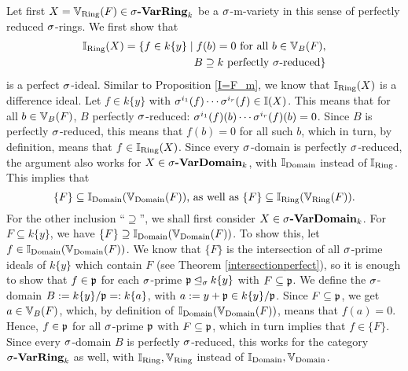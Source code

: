 \begin{prop}
\begin{bew}
Let first $X  = \mathbb{V}_{\operatorname{Ring}}(F) \in \sigma\text{{\normalfont\textbf{-VarRing}}}_k$ be a $\sigma$-m-variety in this sense of perfectly reduced $\sigma$-rings. 
We first show that \begin{align*} \mathbb{I}_{\operatorname{Ring}}(X) =  \{ f \in k\{y\} \mid f(b) = 0 \text{ for all } b \in \mathbb{V}_B(F), \\ B \supseteq k\text{ perfectly }\sigma\text{-reduced} \} \end{align*}
 is a perfect $\sigma$-ideal. Similar to Proposition \ref{I=F_m}, we know that $\mathbb{I}_{\operatorname{Ring}}(X)$ is a difference ideal. Let $f \in k\{y\}$ with $\sigma^{i_1}(f) \cdots \sigma^{i_r}(f) \in \mathbb{I}(X)$. This means that for all $b \in \mathbb{V}_B(F)$,
 $B$ perfectly $\sigma$-reduced: $\sigma^{i_1}(f)(b) \cdots \sigma^{i_r}(f)(b) = 0$. Since $B$ is perfectly $\sigma$-reduced, this means that $f(b) = 0$ for all such $b$,
 which in turn, by definition, means that $f \in \mathbb{I}_{\operatorname{Ring}}(X)$. Since every $\sigma$-domain is perfectly $\sigma$-reduced, the argument also works for $X \in \sigma\text{{\normalfont\textbf{-VarDomain}}}_k$, with $\mathbb{I}_{\operatorname{Domain}}$ instead of $\mathbb{I}_{\operatorname{Ring}}$.
This implies that $$ \{ F \} \subseteq \mathbb{I}_{\operatorname{Domain}}(\mathbb{V}_{\operatorname{Domain}}(F))\text{, as well as } \{ F \} \subseteq \mathbb{I}_{\operatorname{Ring}}(\mathbb{V}_{\operatorname{Ring}}(F)).$$
For the other inclusion ``$\supseteq$'', we shall first consider $X \in \sigma\text{{\normalfont\textbf{-VarDomain}}}_k$.
For $F \subseteq k\{y\}$, we have $\{F\} \supseteq \mathbb{I}_{\operatorname{Domain}}(\mathbb{V}_{\operatorname{Domain}}(F))$. To show this, let $f \in \mathbb{I}_{\operatorname{Domain}}(\mathbb{V}_{\operatorname{Domain}}(F))$.
We know that $\{F\}$ is the intersection of all $\sigma$-prime ideals of $k\{y\}$ which contain $F$ (see Theorem \ref{intersectionperfect}), so it is enough to show that $f \in \mathfrak{p}$ for each $\sigma$-prime $\mathfrak{p} \unlhd_{\sigma} k\{y\}$ with $F \subseteq \mathfrak{p}$.
We define the $\sigma$-domain $B:= k\{y\}/\mathfrak{p} =: k\{a\}$, with $a := y + \mathfrak{p} \in k\{y\}/\mathfrak{p}$. Since $F \subseteq \mathfrak{p}$, we get $a \in \mathbb{V}_B(F)$, which, by definition of $\mathbb{I}_{\operatorname{Domain}}(\mathbb{V}_{\operatorname{Domain}}(F))$, means that $f(a) = 0$. Hence, $f \in \mathfrak{p}$ for all $\sigma$-prime $\mathfrak{p}$
with $F \subseteq \mathfrak{p}$, which in turn implies that $f \in \{F\}$. Since every $\sigma$-domain $B$ is perfectly $\sigma$-reduced, this works for the category $\sigma\text{{\normalfont\textbf{-VarRing}}}_k$ as well, with $\mathbb{I}_{\operatorname{Ring}}, \mathbb{V}_{\operatorname{Ring}}$ instead of $\mathbb{I}_{\operatorname{Domain}}, \mathbb{V}_{\operatorname{Domain}}$.
\end{bew}

\end{prop}

